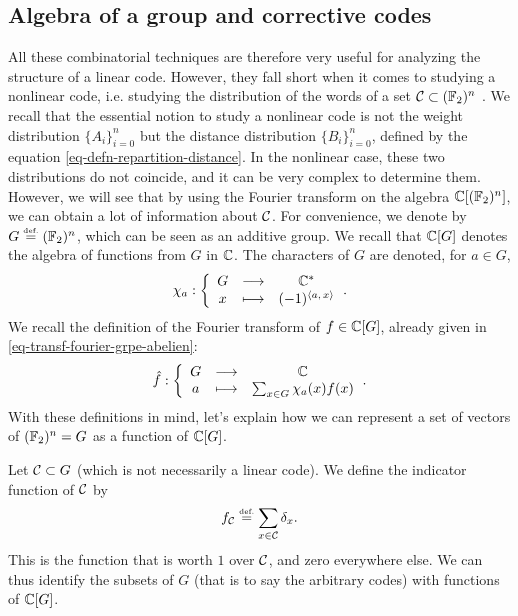 \subsection{Algebra of a group and corrective codes}
\label{sect2-algebre-group-correctors-codes}
 
 All these combinatorial techniques are therefore very useful for analyzing the structure of a linear code. However, they fall short when it comes to studying a nonlinear code, i.e. studying the distribution of the words of a set $ \mathcal{C} \subset (\mathbb{F}_2)^n $ . We recall that the essential notion to study a nonlinear code is not the weight distribution $ \{A_i\}_{i = 0}^n $ but the distance distribution $ \{B_i\}_{i = 0}^n $, defined by the equation \eqref{eq-defn-repartition-distance}. In the nonlinear case, these two distributions do not coincide, and it can be very complex to determine them. However, we will see that by using the Fourier transform on the algebra $ \mathbb{C} [(\mathbb{F}_2)^n] $, we can obtain a lot of information about $ \mathcal{C} $. For convenience, we denote by $ G \stackrel{\mbox{\upshape\tiny def.}}{=}(\mathbb{F}_2)^n $, which can be seen as an additive group. We recall that $ \mathbb{C} [G] $ denotes the algebra of functions from $ G $ in $ \mathbb{C} $. The characters of $ G $ are denoted, for $ a \in G $,
\begin{equation*}
\chi_a: {\left\{ \begin{array}{ccc} G & \longrightarrow & \mathbb{C}^* \\ x & \longmapsto & (-1)^{\langle a,\,x\rangle} \end{array} \right.}.
\end{equation*}
We recall the definition of the Fourier transform of $ f \in \mathbb{C} [G] $, already given in \eqref{eq-transf-fourier-grpe-abelien}:
\begin{equation*}
\hat{f}: {\left\{ \begin{array}{ccc} G & \longrightarrow & \mathbb{C} \\ a & \longmapsto & \sum_{x \in G}{\chi_a (x) f(x)} \end{array} \right.}.
\end{equation*}
With these definitions in mind, let's explain how we can represent a set of vectors of $ (\mathbb{F}_2)^n = G $ as a function of $ \mathbb{C} [G] $.
 
\begin{defn}
 Let $ \mathcal{C} \subset G $ (which is not necessarily a linear code). We define the indicator function of $ \mathcal{C} $ by
\begin{equation*}
f_{\mathcal{C}} \stackrel{\mbox{\upshape\tiny def.}}{=} \sum_{x \in \mathcal{C}}{\delta_x}.
\end{equation*}
This is the function that is worth $ 1 $ over $ \mathcal{C} $, and zero everywhere else. We can thus identify the subsets of $ G $ (that is to say the arbitrary codes) with functions of $ \mathbb{C} [G] $.
\end{defn}

